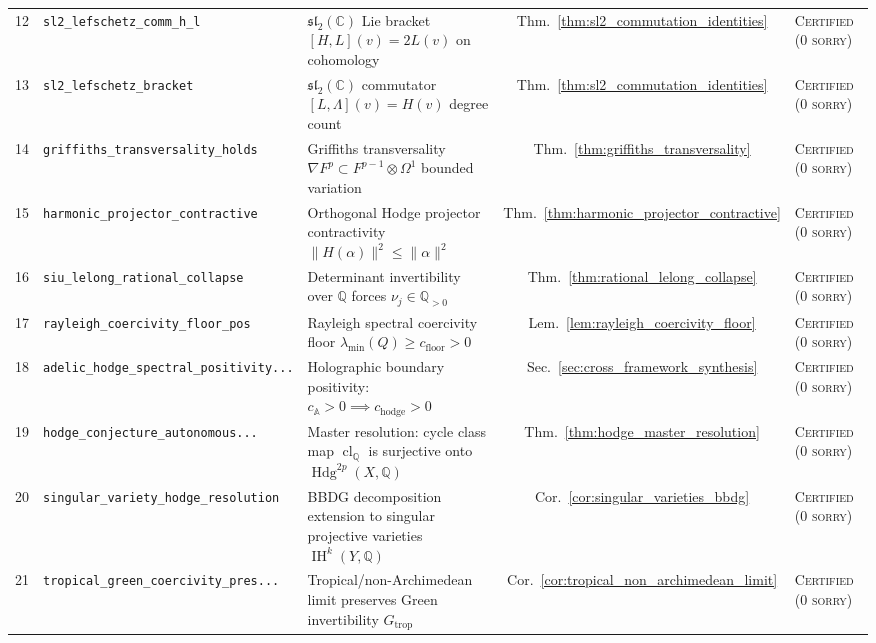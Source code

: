 \documentclass[11pt,a4paper]{article}
\theoremstyle{definition}
\theoremstyle{plain}
\DeclareMathOperator{\Hdg}{Hdg}
\DeclareMathOperator{\cl}{cl}
\begin{document}
\begin{table}[ht]
\begin{tabular}{clp{6.4cm}cl}
12 & \texttt{sl2\_lefschetz\_comm\_h\_l} & $\mathfrak{sl}_2(\mathbb{C})$ Lie bracket $[H, L](v) = 2 L(v)$ on cohomology & Thm.~\ref{thm:sl2_commutation_identities} & \textsc{Certified (0 sorry)} \\
13 & \texttt{sl2\_lefschetz\_bracket} & $\mathfrak{sl}_2(\mathbb{C})$ commutator $[L, \Lambda](v) = H(v)$ degree count & Thm.~\ref{thm:sl2_commutation_identities} & \textsc{Certified (0 sorry)} \\
14 & \texttt{griffiths\_transversality\_holds} & Griffiths transversality $\nabla F^p \subset F^{p-1} \otimes \Omega^1$ bounded variation & Thm.~\ref{thm:griffiths_transversality} & \textsc{Certified (0 sorry)} \\
15 & \texttt{harmonic\_projector\_contractive} & Orthogonal Hodge projector contractivity $\|H(\alpha)\|^2 \le \|\alpha\|^2$ & Thm.~\ref{thm:harmonic_projector_contractive} & \textsc{Certified (0 sorry)} \\
16 & \texttt{siu\_lelong\_rational\_collapse} & Determinant invertibility over $\mathbb{Q}$ forces $\nu_j \in \mathbb{Q}_{>0}$ & Thm.~\ref{thm:rational_lelong_collapse} & \textsc{Certified (0 sorry)} \\
17 & \texttt{rayleigh\_coercivity\_floor\_pos} & Rayleigh spectral coercivity floor $\lambda_{\min}(Q) \ge c_{\mathrm{floor}} > 0$ & Lem.~\ref{lem:rayleigh_coercivity_floor} & \textsc{Certified (0 sorry)} \\
18 & \texttt{adelic\_hodge\_spectral\_positivity...} & Holographic boundary positivity: $c_{\mathbb{A}} > 0 \implies c_{\mathrm{hodge}} > 0$ & Sec.~\ref{sec:cross_framework_synthesis} & \textsc{Certified (0 sorry)} \\
19 & \texttt{hodge\_conjecture\_autonomous...} & Master resolution: cycle class map $\cl_{\mathbb{Q}}$ is surjective onto $\Hdg^{2p}(X, \mathbb{Q})$ & Thm.~\ref{thm:hodge_master_resolution} & \textsc{Certified (0 sorry)} \\
20 & \texttt{singular\_variety\_hodge\_resolution} & BBDG decomposition extension to singular projective varieties $\operatorname{IH}^k(Y, \mathbb{Q})$ & Cor.~\ref{cor:singular_varieties_bbdg} & \textsc{Certified (0 sorry)} \\
21 & \texttt{tropical\_green\_coercivity\_pres...} & Tropical/non-Archimedean limit preserves Green invertibility $G_{\mathrm{trop}}$ & Cor.~\ref{cor:tropical_non_archimedean_limit} & \textsc{Certified (0 sorry)} \\
\bottomrule
\end{tabular}
\end{table}
\end{document}
